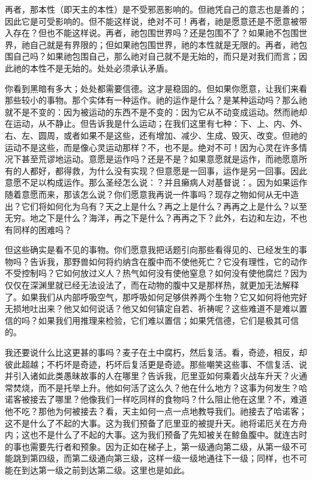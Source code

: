 再者，那本性（即天主的本性）是不受邪恶影响的。但祂凭自己的意志也是善的；因此它是可受影响的。但不能这样说，绝对不可！再者，祂是愿意还是不愿意被带入存在？但也不能这样说。再者，祂包围世界吗？还是包围不了？如果祂不包围世界，祂自己就是有界限的；但如果祂包围世界，祂的本性就是无限的。再者，祂包围自己吗？如果祂包围自己，那么祂对自己就不是无始的，而只是对我们而言；因此祂的本性不是无始的。处处必须承认矛盾。\par

你看到黑暗有多大；处处都需要信德。这才是稳固的。但如果你愿意，让我们来看那些较小的事物。那个实体有一种运作。祂的运作是什么？是某种运动吗？那么祂就不是不变的：因为被运动的东西不是不变的：因为它从不动变成运动。然而祂却在运动，从不静止。但告诉我是什么运动；在我们这里有七种：下、上、内、外、右、左、圆周，或者如果不是这些，还有增加、减少、生成、毁灭、改变。但祂的运动不是这些，而是像心灵运动那样？不，也不是。绝对不可！因为心灵在许多情况下甚至荒谬地运动。意愿是运作吗？还是不是？如果意愿就是运作，而祂愿意所有的人都好，都得救，为什么没有实现？但意愿是一回事，运作是另一回事。因此意愿不足以构成运作。那么圣经怎么说：？并且癞病人对基督说：。因为如果运作随着意愿而来，那该怎么说？你们愿意我再说一件事吗？现存之物如何从无中造出？它们将如何化为乌有？天之上是什么？再之上是什么？再再之上是什么？以至无穷。地之下是什么？海洋，再之下是什么？再再之下？此外，右边和左边，不也有同样的困难吗？\par

但这些确实是看不见的事物。你们愿意我把话题引向那些看得见的、已经发生的事物吗？告诉我，那野兽如何将约纳含在腹中而不使他死亡？它没有理性，它的动作不受控制吗？它如何放过义人？热气如何没有使他窒息？如何没有使他腐烂？因为仅仅在深渊里就已经无法设法了，而在动物的腹中又是那样热，就更加无法解释了。如果我们从内部呼吸空气，那呼吸如何足够供养两个生物？它又如何将他完好无损地吐出来？他又如何说话？他又如何镇定自若、祈祷呢？这些难道不是难以置信的吗？如果我们用推理来检验，它们难以置信；如果凭信德，它们是极其可信的。\par

我还要说什么比这更甚的事吗？麦子在土中腐朽，然后复活。看，奇迹，相反，却彼此超越；不朽坏是奇迹，朽坏后复活更是奇迹。那些嘲笑这些事、不信复活、说并引入诸如此类愚昧故事的人在哪里？告诉我，厄里亚如何乘着火战车升天？火通常焚烧，而不是托举上升。他如何活了这么久？他在什么地方？这事为何发生？哈诺客被接去了哪里？他像我们一样吃同样的食物吗？什么阻止他在这里？不，难道他不吃？那他为何被接去？看，天主如何一点一点地教导我们。祂接去了哈诺客；这不是什么了不起的大事。这为我们预备了厄里亚的被提升天。祂将诺厄关在方舟内；这也不是什么了不起的大事。这为我们预备了先知被关在鲸鱼腹中。就连古时的事也需要先行者和预象。因为正如在梯子上，第一级通向第二级，从第一级不可能跳到第四级，而第二级通向第三级，这样一级一级地通往下一级；同样，也不可能在到达第一级之前到达第二级。这里也是如此。\par

